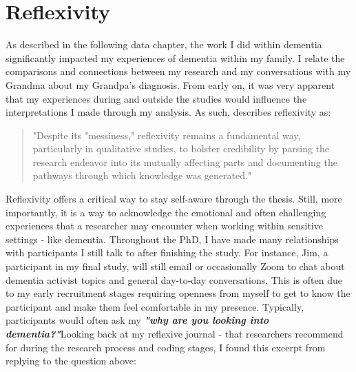 \section{Reflexivity}
\label{Method:Reflectivity}
 As described in the following data chapter, the work I did within dementia significantly impacted my experiences of dementia within my family. I relate the comparisons and connections between my research and my conversations with my Grandma about my Grandpa's diagnosis. From early on, it was very apparent that my experiences during and outside the studies would influence the interpretations I made through my analysis. As such, \cite{probst2015eye} describes reflexivity as:
\begin{quote}
"Despite its "messiness," reflexivity remains a fundamental way, particularly in qualitative studies, to bolster credibility by parsing the research endeavor into its mutually affecting parts and documenting the pathways through which knowledge was generated." \citep{probst2015eye}
\end{quote}

Reflexivity offers a critical way to stay self-aware through the thesis. Still, more importantly, it is a way to acknowledge the emotional and often challenging experiences that a researcher may encounter when working within sensitive settings - like dementia. Throughout the PhD, I have made many relationships with participants I still talk to after finishing the study. For instance, Jim, a participant in my final study, will still email or occasionally Zoom to chat about dementia activist topics and general day-to-day conversations. This is often due to my early recruitment stages requiring openness from myself to get to know the participant and make them feel comfortable in my presence. Typically, participants would often ask my \textit{\textbf{"why are you looking into dementia?"}}Looking back at my reflexive journal - that researchers recommend for during the research process and coding stages, I found this excerpt from  replying to the question above:

